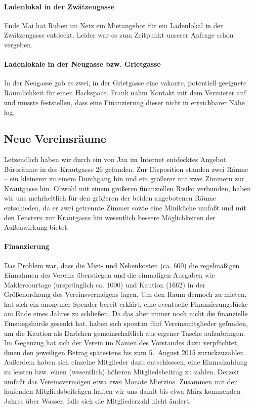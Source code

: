 \documentclass[10pt,DIV16]{scrartcl}
\begin{document}
\paragraph{Ladenlokal in der Zwätzengasse}

Ende Mai hat Ruben im Netz ein Mietangebot für ein Ladenlokal in der
Zwätzengasse entdeckt.  Leider war es zum Zeitpunkt unserer Anfrage schon
vergeben.

\paragraph{Ladenlokale in der Neugasse bzw. Grietgasse}

In der Neugasse gab es zwei, in der Grietgasse eine vakante,
potentiell geeignete Räumlichkeit für einen Hackspace. Frank nahm
Kontakt mit dem Vermieter auf und musste feststellen, dass eine
Finanzierung dieser nicht in erreichbarer Nähe lag.

\subsection{Neue Vereinsräume}

Letzendlich haben wir durch ein von Jan im Internet entdecktes 
Angebot Büroräume in der Krautgasse 26 gefunden.  Zur Disposition 
standen zwei Räume -- ein kleinerer zu einem Durchgang hin und ein 
größerer mit zwei Zimmern zur Krautgasse hin.  Obwohl mit einem 
größeren finanziellen Risiko verbunden, haben wir uns mehrheitlich 
für den größeren der beiden angebotenen Räume entschieden, da er 
zwei getrennte Zimmer sowie eine Miniküche umfaßt und mit den 
Fenstern zur Krautgasse hin wesentlich bessere Möglichkeiten der 
Außenwirkung bietet.

\paragraph{Finanzierung}
\label{sec:krautspace_kaution}

Das Problem war, dass die Miet- und Nebenkosten (ca. 600\EUR) die 
regelmäßigen Einnahmen des Vereins überstiegen und die einmaligen 
Ausgaben wie Maklercourtage (ursprünglich ca. 1000\EUR) und Kaution 
(1662\EUR) in der Größenordnung des Vereinsvermögens lagen.  Um den 
Raum dennoch zu mieten, hat sich ein anonymer Spender bereit 
erklärt, eine eventuelle Finanzierungslücke am Ende eines Jahres zu 
schließen.  Da das aber immer noch nicht die finanzielle 
Einstiegshürde gesenkt hat, haben sich spontan fünf 
Vereinsmitglieder gefunden, um die Kaution als Darlehen 
gemeinschaftlich aus eigener Tasche aufzubringen.  Im Gegenzug hat 
sich der Verein im Namen des Vorstandes dazu verpflichtet, ihnen den 
jeweiligen Betrag spätestens bis zum 5.\ August 2015 
zurückzuzahlen.  Außerdem haben sich einzelne Mitglieder dazu 
entschlossen, eine Einmalzahlung zu leisten bzw. einen (wesentlich) 
höheren Mitgliedsbeitrag zu zahlen.  Derzeit umfaßt das 
Vereinsvermögen etwa zwei Monate Mietzins. Zusammen mit den 
laufenden Mitgliedsbeiträgen halten wir uns damit bis etwa März 
kommenden Jahres über Wasser, falls sich die Mitgliederzahl nicht 
ändert.
\end{document}
